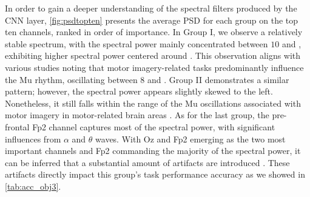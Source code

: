 In order to gain a deeper understanding of the spectral filters produced by the CNN layer, \cref{fig:psdtopten} presents the average PSD for each group on the top ten channels, ranked in order of importance. In Group I, we observe a relatively stable spectrum, with the spectral power mainly concentrated between $10$ and , exhibiting higher spectral power centered around . This observation aligns with various studies noting that motor imagery-related tasks predominantly influence the Mu rhythm, oscillating between $8$ and  \cite{al2021deep,hobson2017interpretation, llanos2013mu}. Group II demonstrates a similar pattern; however, the spectral power appears slightly skewed to the left. Nonetheless, it still falls within the range of the Mu oscillations associated with motor imagery in motor-related brain areas \cite{chen2021mu}. As for the last group, the pre-frontal Fp2 channel captures most of the spectral power, with significant influences from $\alpha$ and $\theta$ waves. With Oz and Fp2 emerging as the two most important channels and Fp2 commanding the majority of the spectral power, it can be inferred that a substantial amount of artifacts are introduced \cite{han2023cepstral}. These artifacts directly impact this group's task performance accuracy as we showed in \cref{tab:acc_obj3}.

